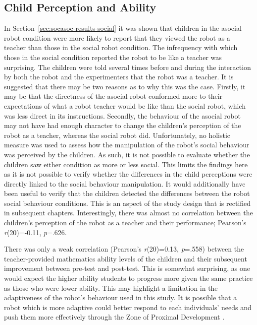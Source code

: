 \subsection{Child Perception and Ability}\label{sec:disc-ability}
In Section~\ref{sec:socasoc-results-social} it was shown that children in the asocial robot condition were more likely to report that they viewed the robot as a teacher than those in the social robot condition. The infrequency with which those in the social condition reported the robot to be like a teacher was surprising. The children were told several times before and during the interaction by both the robot and the experimenters that the robot was a teacher. It is suggested that there may be two reasons as to why this was the case. Firstly, it may be that the directness of the asocial robot conformed more to their expectations of what a robot teacher would be like than the social robot, which was less direct in its instructions. Secondly, the behaviour of the asocial robot may not have had enough character to change the children's perception of the robot as a teacher, whereas the social robot did. Unfortunately, no holistic measure was used to assess how the manipulation of the robot's social behaviour was perceived by the children. As such, it is not possible to evaluate whether the children saw either condition as more or less social. This limits the findings here as it is not possible to verify whether the differences in the child perceptions were directly linked to the social behaviour manipulation. It would additionally have been useful to verify that the children detected the differences between the robot social behaviour conditions. This is an aspect of the study design that is rectified in subsequent chapters. Interestingly, there was almost no correlation between the children's perception of the robot as a teacher and their performance; Pearson's \textit{r}(20)=-0.11, \textit{p}=.626.

There was only a weak correlation (Pearson's \textit{r}(20)=0.13, \textit{p}=.558) between the teacher-provided mathematics ability levels of the children and their subsequent improvement between pre-test and post-test. This is somewhat surprising, as one would expect the higher ability students to progress more given the same practice as those who were lower ability. This may highlight a limitation in the adaptiveness of the robot's behaviour used in this study. It is possible that a robot which is more adaptive could better respond to each individuals' needs and push them more effectively through the Zone of Proximal Development \citep{vygotsky1980mind}.

